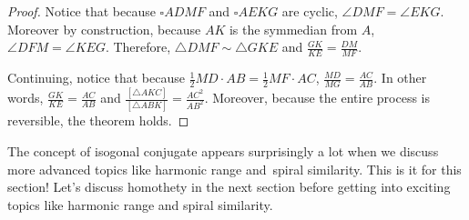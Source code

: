 \documentclass[../../../main.tex]{subfiles}
\begin{document}
\begin{proof}
Notice that because $\square{ADMF}$ and $\square{AEKG}$ are cyclic,
$\angle{DMF} = \angle{EKG}$. Moreover by construction, because
$AK$ is the symmedian from $A$, $\angle{DFM} = \angle{KEG}$.
Therefore, $\triangle{DMF} \sim \triangle{GKE}$ and $\frac{GK}{KE}
= \frac{DM}{MF}$.

Continuing, notice that because $\frac{1}{2} MD \cdot AB =
\frac{1}{2} MF \cdot AC$, $\frac{MD}{MG} = \frac{AC}{AB}$. In other
words, $\frac{GK}{KE} = \frac{AC}{AB}$ and $\frac{[\triangle{AKC}]}
{[\triangle{ABK}]} = \frac{AC^2}{AB^2}$. Moreover, because the
entire process is reversible, the theorem holds.
\end{proof}

The concept of isogonal conjugate appears surprisingly a lot when
we discuss more advanced topics like harmonic range and spiral
similarity. This is it for this section! Let's discuss homothety
in the next section before getting into exciting topics like
harmonic range and spiral similarity.
\end{document}
